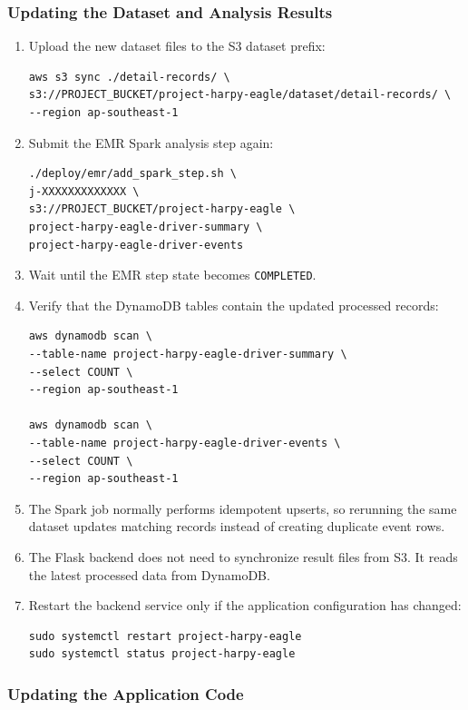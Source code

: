 \documentclass[12pt,a4paper]{article}
\begin{document}
\subsubsection{Updating the Dataset and Analysis Results}

\begin{enumerate}
    \item Upload the new dataset files to the S3 dataset prefix:
\begin{lstlisting}
aws s3 sync ./detail-records/ \
s3://PROJECT_BUCKET/project-harpy-eagle/dataset/detail-records/ \
--region ap-southeast-1
\end{lstlisting}

    \item Submit the EMR Spark analysis step again:
\begin{lstlisting}
./deploy/emr/add_spark_step.sh \
j-XXXXXXXXXXXXX \
s3://PROJECT_BUCKET/project-harpy-eagle \
project-harpy-eagle-driver-summary \
project-harpy-eagle-driver-events
\end{lstlisting}

    \item Wait until the EMR step state becomes \texttt{COMPLETED}.
    \item Verify that the DynamoDB tables contain the updated processed records:
\begin{lstlisting}
aws dynamodb scan \
--table-name project-harpy-eagle-driver-summary \
--select COUNT \
--region ap-southeast-1

aws dynamodb scan \
--table-name project-harpy-eagle-driver-events \
--select COUNT \
--region ap-southeast-1
\end{lstlisting}

    \item The Spark job normally performs idempotent upserts, so rerunning the same dataset updates matching records instead of creating duplicate event rows.
    \item The Flask backend does not need to synchronize result files from S3. It reads the latest processed data from DynamoDB.
    \item Restart the backend service only if the application configuration has changed:
\begin{lstlisting}
sudo systemctl restart project-harpy-eagle
sudo systemctl status project-harpy-eagle
\end{lstlisting}
\end{enumerate}

\subsubsection{Updating the Application Code}
\end{document}
